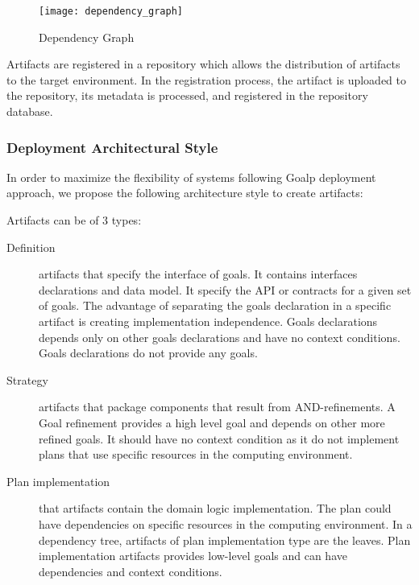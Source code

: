 \begin{figure}[!htb]
  \centering
  \texttt{[image: dependency\_graph]}
  \caption{Dependency Graph}
  \label{fig:dependency_graph}
\end{figure}

Artifacts are registered in a repository which allows the distribution of artifacts to the target environment. In the registration process, the artifact is uploaded to the repository, its metadata is processed, and registered in the repository database.


\subsubsection{Deployment Architectural Style}
\label{depl_arch_style}

In order to maximize the flexibility of systems following Goalp deployment approach, we propose the following architecture style to create artifacts:

Artifacts can be of 3 types:

\begin{description}
  \item[Definition] artifacts that specify the interface of goals. It contains interfaces declarations and data model. It specify the API or contracts for a given set of goals.
  The advantage of separating the goals declaration in a specific artifact is creating implementation independence.
  Goals declarations depends only on other goals declarations and have no context conditions. Goals declarations do not provide any goals.

  \item[Strategy] artifacts that package components that result from AND-refinements. A Goal refinement provides a high level goal and depends on other more refined goals. It should have no context condition as it do not implement plans that use specific resources in the computing environment.

  \item[Plan implementation] that artifacts contain the domain logic implementation. The plan could have dependencies on specific resources in the computing environment.
  In a dependency tree, artifacts of plan implementation type are the leaves.
  Plan implementation artifacts provides low-level goals and can have dependencies and context conditions.

\end{description}

